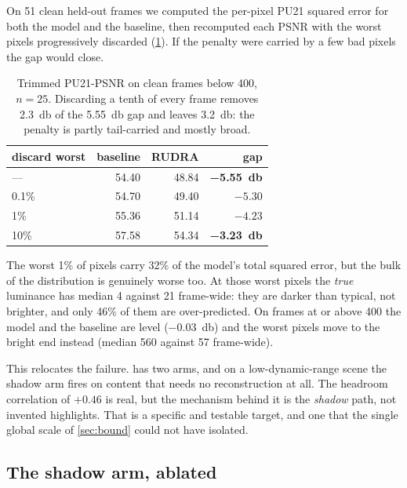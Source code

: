 On 51 clean held-out frames we computed the per-pixel PU21 squared error for
both the model and the baseline, then recomputed each PSNR with the worst pixels
progressively discarded (\cref{tab:trim}). If the penalty were carried by a few
bad pixels the gap would close.

\begin{table}[htbp]
\centering
\caption{Trimmed PU21-PSNR on clean frames below \SI{400}{\nits}, $n = 25$.
Discarding a tenth of every frame removes \SI{2.3}{\decibel} of the
\SI{5.55}{\decibel} gap and leaves \SI{3.2}{\decibel}: the penalty is partly
tail-carried and mostly broad.}
\label{tab:trim}
\begin{tabular}{lrrr}
\toprule
discard worst & baseline & RUDRA & gap \\
\midrule
---     & 54.40 & 48.84 & \textbf{\SI{-5.55}{\decibel}} \\
0.1\%   & 54.70 & 49.40 & $-5.30$ \\
1\%     & 55.36 & 51.14 & $-4.23$ \\
10\%    & 57.58 & 54.34 & \textbf{\SI{-3.23}{\decibel}} \\
\bottomrule
\end{tabular}
\end{table}

The worst 1\% of pixels carry 32\% of the model's total squared error, but the
bulk of the distribution is genuinely worse too. At those worst pixels the
\emph{true} luminance has median \SI{4}{\nits} against \SI{21}{\nits}
frame-wide: they are darker than typical, not brighter, and only 46\% of them
are over-predicted. On frames at or above \SI{400}{\nits} the model and the
baseline are level (\SI{-0.03}{\decibel}) and the worst pixels move to the
bright end instead (median \SI{560}{\nits} against \SI{57}{\nits} frame-wide).

This relocates the failure.  has two arms, and on a
low-dynamic-range scene the shadow arm fires on content that needs no
reconstruction at all. The headroom correlation of $+0.46$ is real, but the
mechanism behind it is the \emph{shadow} path, not invented highlights. That is
a specific and testable target, and one that the single global scale of
\cref{sec:bound} could not have isolated.

\subsection{The shadow arm, ablated}
\label{sec:ablation}

